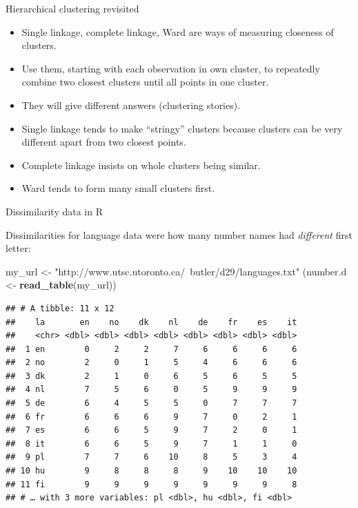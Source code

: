 \documentclass[ignorenonframetext,]{beamer}
\newenvironment{Shaded}{\begin{snugshade}}{\end{snugshade}}
\newcommand{\KeywordTok}[1]{\textcolor[rgb]{0.13,0.29,0.53}{\textbf{#1}}}
\newcommand{\NormalTok}[1]{#1}
\newcommand{\StringTok}[1]{\textcolor[rgb]{0.31,0.60,0.02}{#1}}
\begin{document}
\begin{frame}{Hierarchical clustering revisited}
\protect\hypertarget{hierarchical-clustering-revisited}{}

\begin{itemize}
\item
  Single linkage, complete linkage, Ward are ways of measuring closeness
  of clusters.
\item
  Use them, starting with each observation in own cluster, to repeatedly
  combine two closest clusters until all points in one cluster.
\item
  They will give different answers (clustering stories).
\item
  Single linkage tends to make ``stringy'' clusters because clusters can
  be very different apart from two closest points.
\item
  Complete linkage insists on whole clusters being similar.
\item
  Ward tends to form many small clusters first.
\end{itemize}

\end{frame}

\begin{frame}[fragile]{Dissimilarity data in R}
\protect\hypertarget{dissimilarity-data-in-r}{}

Dissimilarities for language data were how many number names had
\emph{different} first letter:

\footnotesize

\begin{Shaded}
\begin{Highlighting}[]
\NormalTok{my_url <-}\StringTok{ "http://www.utsc.utoronto.ca/~butler/d29/languages.txt"}
\NormalTok{(number.d <-}\StringTok{ }\KeywordTok{read_table}\NormalTok{(my_url))}
\end{Highlighting}
\end{Shaded}

\begin{verbatim}
## # A tibble: 11 x 12
##    la       en    no    dk    nl    de    fr    es    it
##    <chr> <dbl> <dbl> <dbl> <dbl> <dbl> <dbl> <dbl> <dbl>
##  1 en        0     2     2     7     6     6     6     6
##  2 no        2     0     1     5     4     6     6     6
##  3 dk        2     1     0     6     5     6     5     5
##  4 nl        7     5     6     0     5     9     9     9
##  5 de        6     4     5     5     0     7     7     7
##  6 fr        6     6     6     9     7     0     2     1
##  7 es        6     6     5     9     7     2     0     1
##  8 it        6     6     5     9     7     1     1     0
##  9 pl        7     7     6    10     8     5     3     4
## 10 hu        9     8     8     8     9    10    10    10
## 11 fi        9     9     9     9     9     9     9     8
## # … with 3 more variables: pl <dbl>, hu <dbl>, fi <dbl>
\end{verbatim}

\normalsize

\end{frame}
\end{document}
